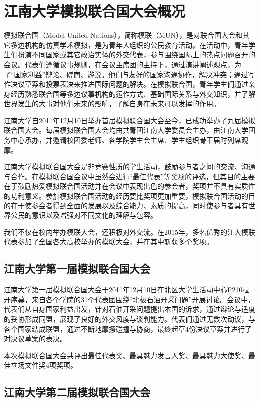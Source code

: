 \documentclass[a4paper,openany]{book}
\begin{document}
\chapter{江南大学模拟联合国大会概况}

模拟联合国（Model United Nations），简称模联（MUN），是对联合国大会和其它多边机构的仿真学术模拟，是为青年人组织的公民教育活动。在活动中，青年学生们扮演不同国家或其它政治实体的外交代表，参与围绕国际上的热点问题召开的会议。代表们遵循议事规则，在会议主席团的主持下，通过演讲阐述观点，为了“国家利益”辩论、磋商、游说。他们与友好的国家沟通协作，解决冲突；通过写作决议草案和投票表决来推进国际问题的解决。在模拟联合国，青年学生们通过亲身经历熟悉联合国等多边议事机构的运作方式、基础国际关系与外交知识，并了解世界发生的大事对他们未来的影响，了解自身在未来可以发挥的作用。

江南大学自2011年12月10日举办首届模拟联合国大会至今，已成功举办了九届模拟联合国大会。每届模拟联合国大会均由共青团江南大学委员会主办，由江南大学团务中心承办，并邀请校团委老师、各学院学生会主席、学生组织骨干届时列席观摩。

江南大学模拟联合国大会是非竞赛性质的学生活动，鼓励参与者之间的交流、沟通与合作。在模拟联合国会议中虽然会进行“最佳代表”等奖项的评选，但其目的主要在于鼓励热爱模拟联合国活动并在会议中表现出色的参会者，奖项并不具有实质性的功利意义。参加模拟联合国活动的经历要比奖项更加重要，模拟联合国活动的目的在于使参会者得到全面的发展以及综合能力、素质的提高，同时使参与者具有世界公民的意识以及增强对不同文化的理解与包容。

我们不仅在校内举办模联大会，还积极对外交流。在2015年，多名优秀的江大模联代表参加了全国各大高校举办的模联大会，并在其中斩获多个奖项。

\section{江南大学第一届模拟联合国大会}

江南大学第一届模拟联合国大会于2011年12月10日在北区大学生活动中心F210拉开序幕，来自各个学院的31个代表团围绕“北极石油开采问题”开展讨论。会议中，代表们从自身国家利益出发，针对石油开采问题提出本国的诉求，通过辩论与适度的妥协形成同盟，展现了良好的外交风度与谈判能力。代表们通过无数次动议，与各个国家结成联盟，通过不断地摩擦碰撞与协商，最终起草4份决议草案并进行了对决议草案的表决。

本次模拟联合国大会共评出最佳代表奖、最具魅力发言人奖、最具魅力大使奖、最佳立场文件奖4项奖项。

\section{江南大学第二届模拟联合国大会}
\end{document}

